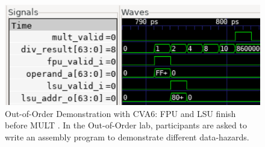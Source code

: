 
\begin{figure}[t]
    \centering
    \includegraphics[width=0.9\linewidth]{media/graphics/labs_with_cva6/OoO.png}
    \caption[
        Out-of-Order Demonstration with CVA6
    ]{
        Out-of-Order Demonstration with CVA6: FPU and LSU finish before MULT \cite{SiffermanLatchUp}. In the Out-of-Order lab, participants are asked to write an assembly program to demonstrate different data-hazards.
    }
    \label{fig:OoO}
\end{figure}

